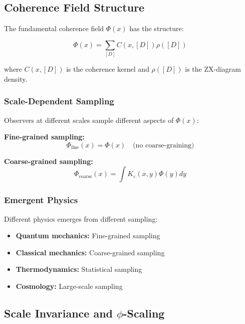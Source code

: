 \documentclass[11pt]{article}
\theoremstyle{definition}
\newcommand{\goldenratio}{\phi}
\newcommand{\density}{\rho}
\begin{document}
\subsection{Coherence Field Structure}

The fundamental coherence field $\Phi(x)$ has the structure:

\begin{equation}
\Phi(x) = \sum_{[D]} C(x, [D]) \density([D])
\end{equation}

where $C(x, [D])$ is the coherence kernel and $\density([D])$ is the ZX-diagram density.

\subsubsection{Scale-Dependent Sampling}

Observers at different scales sample different aspects of $\Phi(x)$:

\textbf{Fine-grained sampling:}
\begin{equation}
\Phi_{\text{fine}}(x) = \Phi(x) \quad \text{(no coarse-graining)}
\end{equation}

\textbf{Coarse-grained sampling:}
\begin{equation}
\Phi_{\text{coarse}}(x) = \int K_\varepsilon(x, y) \Phi(y) dy
\end{equation}

\subsubsection{Emergent Physics}

Different physics emerges from different sampling:

\begin{itemize}
\item \textbf{Quantum mechanics:} Fine-grained sampling
\item \textbf{Classical mechanics:} Coarse-grained sampling
\item \textbf{Thermodynamics:} Statistical sampling
\item \textbf{Cosmology:} Large-scale sampling
\end{itemize}

\subsection{Scale Invariance and $\goldenratio$-Scaling}
\end{document}
